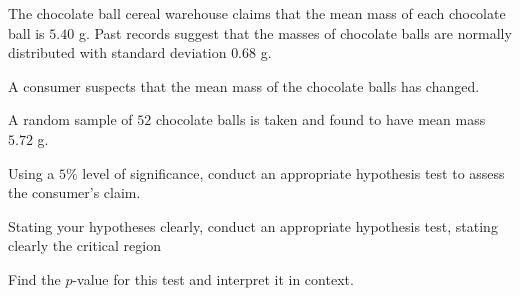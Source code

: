 \begin{example}
    The chocolate ball cereal warehouse claims that the mean mass of each chocolate ball is $5.40$ g. 
    Past records suggest that the masses of chocolate balls are normally distributed with standard deviation $0.68$ g.

    A consumer suspects that the mean mass of the chocolate balls has changed.

    A random sample of $52$ chocolate balls is taken and found to have mean mass $5.72$ g.

    Using a $5\%$ level of significance, conduct an appropriate hypothesis test to assess the consumer's claim.

    Stating your hypotheses clearly, conduct an appropriate hypothesis test, stating clearly the critical region

    Find the $p$-value for this test and interpret it in context.

\end{example}

